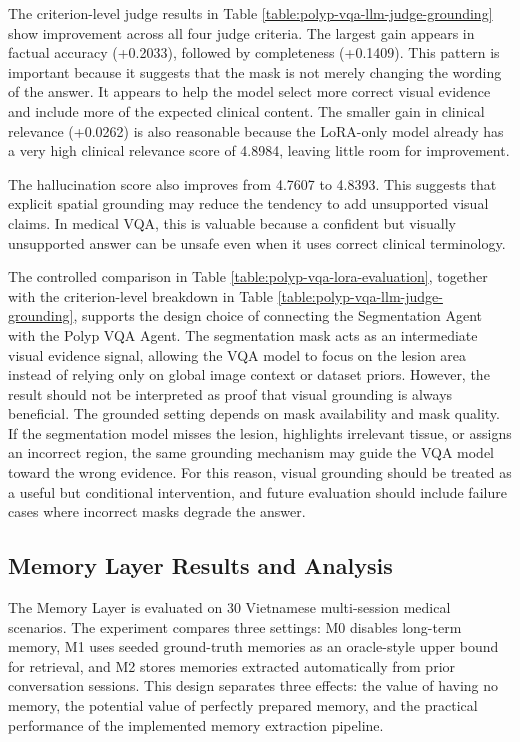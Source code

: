 The criterion-level judge results in Table \ref{table:polyp-vqa-llm-judge-grounding} show improvement across all four judge criteria. The largest gain appears in factual accuracy (+0.2033), followed by completeness (+0.1409). This pattern is important because it suggests that the mask is not merely changing the wording of the answer. It appears to help the model select more correct visual evidence and include more of the expected clinical content. The smaller gain in clinical relevance (+0.0262) is also reasonable because the LoRA-only model already has a very high clinical relevance score of 4.8984, leaving little room for improvement.

The hallucination score also improves from 4.7607 to 4.8393. This suggests that explicit spatial grounding may reduce the tendency to add unsupported visual claims. In medical VQA, this is valuable because a confident but visually unsupported answer can be unsafe even when it uses correct clinical terminology.

The controlled comparison in Table \ref{table:polyp-vqa-lora-evaluation}, together with the criterion-level breakdown in Table \ref{table:polyp-vqa-llm-judge-grounding}, supports the design choice of connecting the Segmentation Agent with the Polyp VQA Agent. The segmentation mask acts as an intermediate visual evidence signal, allowing the VQA model to focus on the lesion area instead of relying only on global image context or dataset priors. However, the result should not be interpreted as proof that visual grounding is always beneficial. The grounded setting depends on mask availability and mask quality. If the segmentation model misses the lesion, highlights irrelevant tissue, or assigns an incorrect region, the same grounding mechanism may guide the VQA model toward the wrong evidence. For this reason, visual grounding should be treated as a useful but conditional intervention, and future evaluation should include failure cases where incorrect masks degrade the answer.

\subsection{Memory Layer Results and Analysis}

The Memory Layer is evaluated on 30 Vietnamese multi-session medical scenarios. The experiment compares three settings: M0 disables long-term memory, M1 uses seeded ground-truth memories as an oracle-style upper bound for retrieval, and M2 stores memories extracted automatically from prior conversation sessions. This design separates three effects: the value of having no memory, the potential value of perfectly prepared memory, and the practical performance of the implemented memory extraction pipeline.

